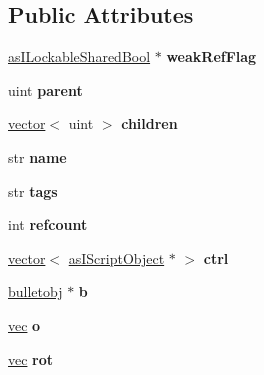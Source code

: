 \subsection*{Public Attributes}
\begin{DoxyCompactItemize}
\item 
\mbox{\label{structnode_a21f617ab7af951e7a190d0b121eb6904}} 
\hyperlink{classas_i_lockable_shared_bool}{as\+I\+Lockable\+Shared\+Bool} $\ast$ {\bfseries weak\+Ref\+Flag}
\item 
\mbox{\label{structnode_ab7aa4f1114fc29effa1cc3310d183ed3}} 
uint {\bfseries parent}
\item 
\mbox{\label{structnode_aaf7eac91e9aa90f120e451cbce171765}} 
\hyperlink{structvector}{vector}$<$ uint $>$ {\bfseries children}
\item 
\mbox{\label{structnode_aa533cf39d65eceb76bc2635198657ea1}} 
str {\bfseries name}
\item 
\mbox{\label{structnode_aae292b99f1747fd63bad566cfbd4654a}} 
str {\bfseries tags}
\item 
\mbox{\label{structnode_a705052bbea64ba8e1330739eb915454a}} 
int {\bfseries refcount}
\item 
\mbox{\label{structnode_abc70ab48243595b43c4f00a318bad217}} 
\hyperlink{structvector}{vector}$<$ \hyperlink{classas_i_script_object}{as\+I\+Script\+Object} $\ast$ $>$ {\bfseries ctrl}
\item 
\mbox{\label{structnode_aa8cac29d20af2a553830d084cb910b67}} 
\hyperlink{structbulletobj}{bulletobj} $\ast$ {\bfseries b}
\item 
\mbox{\label{structnode_a40fc66cefcdaac715ae9940787ce51de}} 
\hyperlink{structvec}{vec} {\bfseries o}
\item 
\mbox{\label{structnode_a19d29ccc85dbe336a9a3df5d930d1977}} 
\hyperlink{structvec}{vec} {\bfseries rot}
\item 
\mbox{\label{structnode_aff498e1d1992b7c09352072200f4df37}} 

\end{DoxyCompactItemize}

